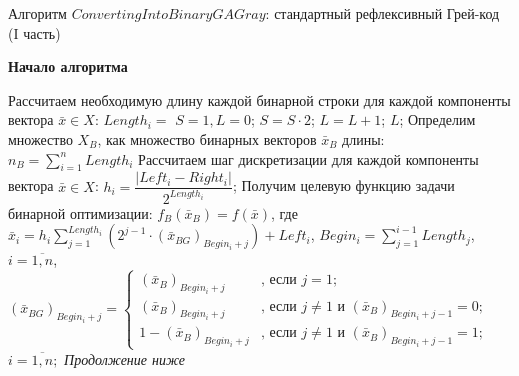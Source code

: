 \begin{algorithm}
\caption{Алгоритм $ ConvertingIntoBinaryGAGray $: стандартный рефлексивный Грей-код (I часть)}\label{StandardGA:alg:ConvertingIntoBinaryGAGray}
\begin{algorithmic}

\State \textbf{Начало алгоритма}

\State Рассчитаем необходимую длину каждой бинарной строки для каждой компоненты вектора $ \bar{x}\in X $:
\State $ Length_i= $
\BeginBlock
\State $ S=1, L=0 $;
\State $ S=S\cdot 2 $;
\State $ L=L+1 $;
\EndWhile
\State \Return $ L $;
\EndBlock
\State Определим множество $ X_B $, как множество бинарных векторов $ \bar{x}_B $ длины:  
\State $ n_B=\sum_{i=1}^{n}Length_i $
\State Рассчитаем шаг дискретизации для каждой компоненты вектора  $ \bar{x} \in X $:  
\State $ h_i=\dfrac{\left| Left_i-Right_i\right| }{2^{Length_i}} $;
\State Получим целевую функцию задачи бинарной оптимизации:
\State $ f_B\left( \bar{x}_B\right)=f\left( \bar{x}\right) $, где
\State $ \bar{x}_i=h_i \sum_{j=1}^{Length_i} \left( 2^{j-1}\cdot {\left( \bar{x}_{BG}\right) }_{Begin_i+j} \right)+Left_i $,
\State $ Begin_i =\sum_{j=1}^{i-1}Length_j $, $ i=\overline{1,n} $,
\State $ {\left( \bar{x}_{BG}\right) }_{Begin_i+j} = \left\lbrace \begin{aligned}
{\left( \bar{x}_{B}\right) }_{Begin_i+j}&\text{, если } j=1; \\ {\left( \bar{x}_{B}\right) }_{Begin_i+j}&\text{, если } j\neq 1 \text{ и } {\left( \bar{x}_{B}\right) }_{Begin_i+j-1}=0; \\1-{\left( \bar{x}_{B}\right) }_{Begin_i+j}&\text{, если } j\neq 1 \text{ и } {\left( \bar{x}_{B}\right) }_{Begin_i+j-1}=1; 
\end{aligned}\right.$
\State $i=\overline{1,n} ;$
\State \textit{Продолжение ниже}
 
  \end{algorithmic}
\end{algorithm}

~\\

